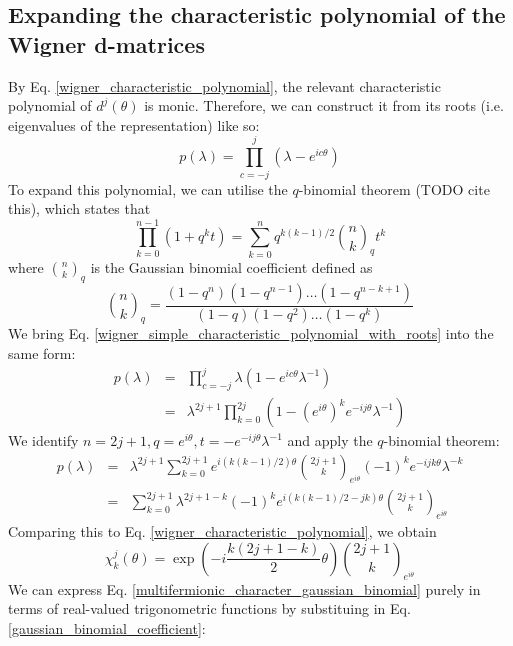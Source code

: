 \documentclass[12pt]{article}
\begin{document}
	\subsection{Expanding the characteristic polynomial of the Wigner d-matrices}
	By Eq. \ref{wigner_characteristic_polynomial}, the relevant characteristic polynomial of $d^j(\theta)$ is monic. Therefore, we can construct it from its roots (i.e. eigenvalues of the representation) like so:
	\begin{equation} \label{wigner_simple_characteristic_polynomial_with_roots}
	p(\lambda)=\prod_{c=-j}^j\left(\lambda-e^{ic\theta}\right)
	\end{equation}
	To expand this polynomial, we can utilise the $q$-binomial theorem (TODO cite this), which states that
	\begin{equation}
	\prod_{k=0}^{n-1}\left(1+q^kt\right)=\sum_{k=0}^{n}q^{k(k-1)/2}{n\choose k}_q t^k
	\end{equation}
	where ${n\choose k}_q$ is the Gaussian binomial coefficient defined as
	\begin{equation} \label{gaussian_binomial_coefficient}
	{n\choose k}_q = \frac{\left(1-q^n\right)\left(1-q^{n-1}\right)\dots \left(1-q^{n-k+1}\right)}{\left(1-q\right)\left(1-q^2\right)\dots \left(1-q^k\right)}
	\end{equation}
	We bring Eq. \ref{wigner_simple_characteristic_polynomial_with_roots} into the same form:
	\begin{eqnarray}
	p(\lambda)&=&\prod_{c=-j}^j\lambda\left(1-e^{ic\theta}\lambda^{-1}\right)\\
	&=&\lambda^{2j+1}\prod_{k=0}^{2j}\left(1-\left(e^{i\theta}\right)^k e^{-ij\theta}\lambda^{-1}\right)
	\end{eqnarray}
	We identify $n=2j+1, q=e^{i\theta}, t=-e^{-ij\theta}\lambda^{-1}$ and apply the $q$-binomial theorem:
	\begin{eqnarray}
	p(\lambda)&=&\lambda^{2j+1}\sum_{k=0}^{2j+1}e^{i(k(k-1)/2)\theta}{2j+1\choose k}_{e^{i\theta}}(-1)^k e^{-ijk\theta}\lambda^{-k}\\
	&=&\sum_{k=0}^{2j+1}\lambda^{2j+1-k}(-1)^k e^{i(k(k-1)/2-jk)\theta}{2j+1\choose k}_{e^{i\theta}}
	\end{eqnarray}
	Comparing this to Eq. \ref{wigner_characteristic_polynomial}, we obtain
	\begin{equation} \label{multifermionic_character_gaussian_binomial}
	\chi^j_k(\theta) = \exp(-i\frac{k(2j+1-k)}{2}\theta) {2j+1\choose k}_{e^{i\theta}}
	\end{equation}
	We can express Eq. \ref{multifermionic_character_gaussian_binomial} purely in terms of real-valued trigonometric functions by substituing in Eq. \ref{gaussian_binomial_coefficient}:
\end{document}
